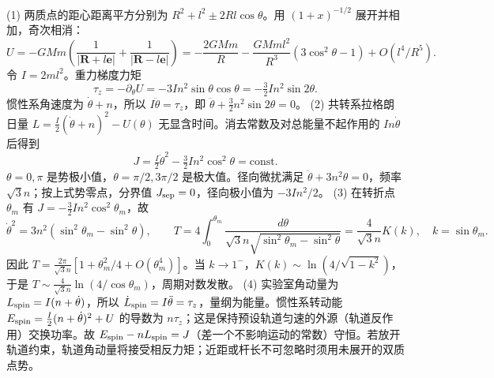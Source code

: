 (1) 两质点的距心距离平方分别为 \(R^2+l^2\pm2Rl\cos\theta\)。用 \((1+x)^{-1/2}\) 展开并相加，奇次相消：
\[
U=-GMm\!\left(\frac1{|\boldsymbol R+l\boldsymbol e|}+
\frac1{|\boldsymbol R-l\boldsymbol e|}\right)
=-\frac{2GMm}{R}-\frac{GMml^2}{R^3}(3\cos^2\theta-1)+O(l^4/R^5).
\]
令 \(I=2ml^2\)。重力梯度力矩
\[
\tau_z=-\partial_\theta U=-3In^2\sin\theta\cos\theta
=-\tfrac32In^2\sin2\theta.
\]
惯性系角速度为 \(\dot\theta+n\)，所以 \(I\ddot\theta=\tau_z\)，即 \(\ddot\theta+\tfrac32n^2\sin2\theta=0\)。
(2) 共转系拉格朗日量 \(L=\frac I2(\dot\theta+n)^2-U(\theta)\) 无显含时间。消去常数及对总能量不起作用的 \(In\dot\theta\) 后得到
\[
J=\tfrac I2\dot\theta^2-\tfrac32In^2\cos^2\theta=\mathrm{const}.
\]
\(\theta=0,\pi\) 是势极小值，\(\theta=\pi/2,3\pi/2\) 是极大值。径向微扰满足 \(\ddot\theta+3n^2\theta=0\)，频率 \(\sqrt3 n\)；按上式势零点，分界值 \(J_{\rm sep}=0\)，径向极小值为 \(-3In^2/2\)。
(3) 在转折点 \(\theta_m\) 有 \(J=-\tfrac32In^2\cos^2\theta_m\)，故
\[
\dot\theta^2=3n^2(\sin^2\theta_m-\sin^2\theta),\qquad
T=4\int_0^{\theta_m}\frac{d\theta}{\sqrt3n\sqrt{\sin^2\theta_m-\sin^2\theta}}
=\frac4{\sqrt3n}K(k),\quad k=\sin\theta_m.
\]
因此 \(T=\frac{2\pi}{\sqrt3n}[1+\theta_m^2/4+O(\theta_m^4)]\)。当 \(k\to1^-\)，\(K(k)\sim\ln(4/\sqrt{1-k^2})\)，于是 \(T\sim\frac4{\sqrt3n}\ln(4/\cos\theta_m)\)，周期对数发散。
(4) 实验室角动量为 \(L_{\rm spin}=I(n+\dot\theta)\)，所以 \(\dot L_{\rm spin}=I\ddot\theta=\tau_z\)，量纲为能量。惯性系转动能 \(E_{\rm spin}=\frac I2(n+\dot\theta)^2+U\) 的导数为 \(n\tau_z\)；这是保持预设轨道匀速的外源（轨道反作用）交换功率。故 \(E_{\rm spin}-nL_{\rm spin}=J\)（差一个不影响运动的常数）守恒。若放开轨道约束，轨道角动量将接受相反力矩；近距或杆长不可忽略时须用未展开的双质点势。
